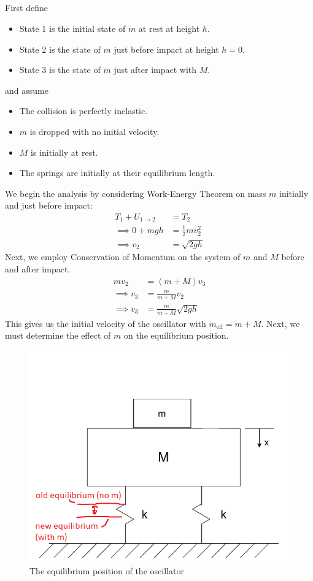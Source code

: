\subsection{}
First define
\begin{itemize}
    \item State 1 is the initial state of $m$ at rest at height $h$.
    \item State 2 is the state of $m$ just before impact at height $h = 0$.
    \item State 3 is the state of $m$ just after impact with $M$.
\end{itemize}
and assume
\begin{itemize}
    \item The collision is perfectly inelastic.
    \item $m$ is dropped with no initial velocity.
    \item $M$ is initially at rest.
    \item The springs are initially at their equilibrium length.
\end{itemize}
We begin the analysis by considering Work-Energy Theorem on mass $m$ initially and just before impact:
\begin{align*}
    T_1 + U_{1 \to 2} &= T_2 \\
    \implies 0 + m g h &= \frac{1}{2} m v_2^2 \\
    \implies v_2 &= \sqrt{2 g h}
\end{align*}
Next, we employ Conservation of Momentum on the system of $m$ and $M$ before and after impact. 
\begin{align*}
    m v_2 &= (m + M) v_3 \\
    \implies v_3 &= \frac{m}{m + M} v_2 \\
    \implies v_3 &= \frac{m}{m + M} \sqrt{2 g h}
\end{align*}
This gives us the initial velocity of the oscillator with $m_{\text{eff}} = m + M$. Next, we must determine the effect of $m$ on the equilibrium position.
\begin{figure}[h]
    \centering
    \includegraphics[width=0.5\linewidth]{Questions/Figures/q5 equilibrium change.png}
    \caption{The equilibrium position of the oscillator}
    \label{fig:q5_equilibrium_change-png}
\end{figure}
